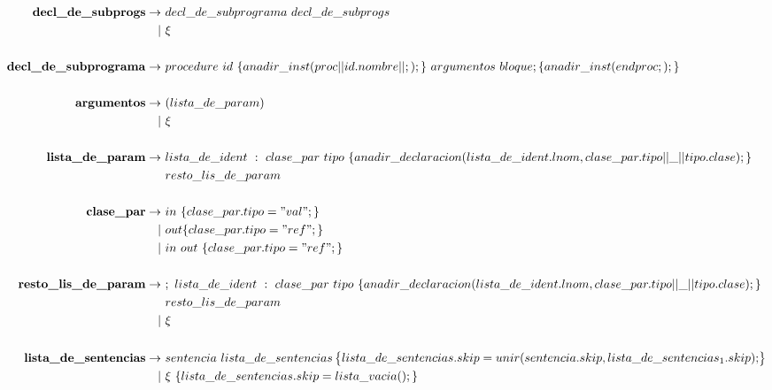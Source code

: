 \documentclass[12pt,a4paper,landscape]{article}
\theoremstyle{mytheor}
\begin{document}
\begin{center}
  \begin{alignat*}{2}
     \text{\textbf{decl\_de\_subprogs}} \to\ &decl\_de\_subprograma\ decl\_de\_subprogs\\
    |\ &\xi\\\\
     \text{\textbf{decl\_de\_subprograma}} \to\ &procedure\ id\ \{anadir\_inst( proc|| id.nombre || ;); \}\ argumentos\ bloque ; \{anadir\_inst(endproc;); \}\\\\
     \text{\textbf{argumentos}} \to\ & ( lista\_de\_param )\\
    |\ &\xi\\\\
     \text{\textbf{lista\_de\_param}} \to\ & lista\_de\_ident\ :\ clase\_par\ tipo\ \{ anadir\_declaracion(lista\_de\_ident.lnom, clase\_par.tipo||\_||tipo.clase);\}\\
    &resto\_lis\_de\_param\\\\
    \text{\textbf{clase\_par}} \to\ &in\ \{ clase\_par.tipo = "val";\}\\ 
    |\ &out  \{ clase\_par.tipo = "ref";\}\\
    |\ &in\ out\ \{ clase\_par.tipo = "ref";\}\\\\
     \text{\textbf{resto\_lis\_de\_param}} \to\ &;\ lista\_de\_ident\ :\ clase\_par\ tipo\ \{ anadir\_declaracion(lista\_de\_ident.lnom, clase\_par.tipo||\_||tipo.clase);\}\\
    &resto\_lis\_de\_param\\
    |\ &\xi\\\\
     \text{\textbf{lista\_de\_sentencias}} \to\ & sentencia\ lista\_de\_sentencias \begin{Bmatrix} lista\_de\_sentencias.skip=unir(sentencia.skip, lista\_de\_sentencias_1.skip); \end{Bmatrix} \\
    |\ &\xi\ \{lista\_de\_sentencias.skip=lista\_vacia();\}\\ 
  \end{alignat*}
\end{center}
\end{document}
